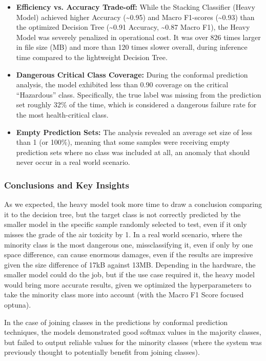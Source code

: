 \documentclass[a4paper,12pt]{article}
\begin{document}
	\begin{itemize}
		\item \textbf{Efficiency vs. Accuracy Trade-off:} While the Stacking Classifier (Heavy Model) achieved higher Accuracy (\~{}0.95) and Macro F1-scores (\~{}0.93) than the optimized Decision Tree (\~{}0.91 Accuracy, \~{}0.87 Macro F1), the Heavy Model was severely penalized in operational cost. It was over 826 times larger in file size (MB) and more than 120 times slower overall, during inference time compared to the lightweight Decision Tree.
		
		\item \textbf{Dangerous Critical Class Coverage:} During the conformal prediction analysis, the model exhibited less than 0.90 coverage on the critical ``Hazardous'' class. Specifically, the true label was missing from the prediction set roughly 32\% of the time, which is considered a dangerous failure rate for the most health-critical class.
		
		\item \textbf{Empty Prediction Sets:} The analysis revealed an average set size of less than 1 (or 100\%), meaning that some samples were receiving empty prediction sets where no class was included at all, an anomaly that should never occur in a real world scenario.
		
	\end{itemize}
	
	\subsubsection{Conclusions and Key Insights}
	As we expected, the heavy model took more time to draw a conclusion comparing it to the decision tree, but the target class is not correctly predicted by the smaller model in the specific sample randomly selected to test, even if it only misses the grade of the air toxicity by 1. In a real world scenario, where the minority class is the most dangerous one, missclassifying it, even if only by one space difference, can cause enormous damages, even if the results are impresive given the size difference of 17kB against 13MB. Depending in the hardware, the smaller model could do the job, but if the use case  required it, the heavy model would bring more accurate results, given we optimized the hyperparameters to take the minority class more into account (with the Macro F1 Score focused optuna).
	
	In the case of joining classes in the predictions by conformal prediction techniques, the models demonstrated good softmax values in the majority classes, but failed to output reliable values for the minority classes (where the system was previously thought to potentially benefit from joining classes).
	
\end{document}
